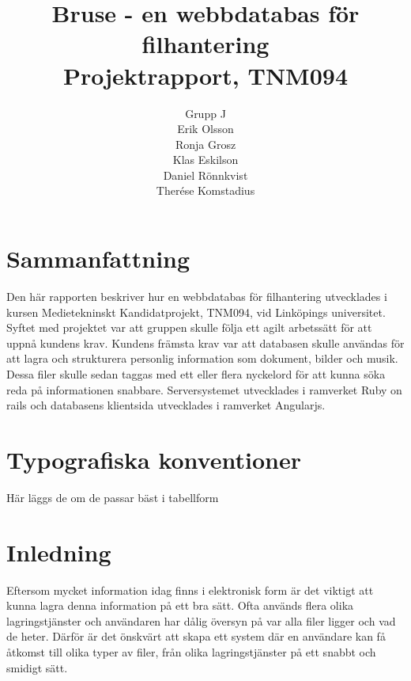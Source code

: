 \documentclass[a4paper,12pt,oneside,final]{extbook}
\title{Bruse - en webbdatabas för filhantering\\Projektrapport, TNM094}
\author{Grupp J\\Erik Olsson\\Ronja Grosz\\Klas Eskilson\\Daniel Rönnkvist\\Therése Komstadius}
\begin{document}
\pagestyle{empty}
\thispagestyle{empty}

\frontmatter

\maketitle

\pagestyle{fancy}

\chapter{Sammanfattning}
Den här rapporten beskriver hur en webbdatabas för filhantering utvecklades i kursen Medietekninskt Kandidatprojekt, TNM094, vid Linköpings universitet. Syftet med projektet var att gruppen skulle följa ett agilt arbetssätt för att uppnå kundens krav. Kundens främsta krav var att databasen skulle användas för att lagra och strukturera personlig information som dokument, bilder och musik. Dessa filer skulle sedan taggas med ett eller flera nyckelord för att kunna söka reda på informationen snabbare. Serversystemet utvecklades i ramverket Ruby on rails och databasens klientsida utvecklades i ramverket Angularjs.

\tableofcontents

\cleardoublepage
{}
\listoffigures

\cleardoublepage
{}
\listoftables

\chapter{Typografiska konventioner}
Här läggs de om de passar bäst i tabellform

\mainmatter

\chapter{Inledning}
\label{ch:inledning}
Eftersom mycket information idag finns i elektronisk form är det viktigt att kunna lagra denna information på ett bra sätt. Ofta används flera olika lagringstjänster och användaren har dålig översyn på var alla filer ligger och vad de heter. Därför är det önskvärt att skapa ett system där en användare kan få åtkomst till olika typer av filer, från olika lagringstjänster på ett snabbt och smidigt sätt.
\end{document}
